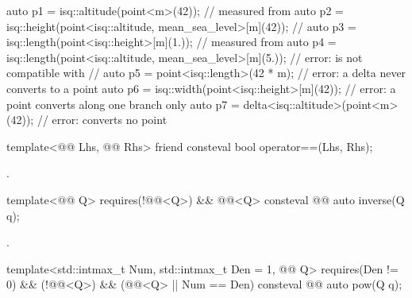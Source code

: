 \begin{itemdescr}
\begin{example}
\begin{codeblock}
auto p1 = isq::altitude(point<m>(42));                      // measured from 
auto p2 = isq::height(point<isq::altitude, mean_sea_level>[m](42));
                                                           // 
auto p3 = isq::length(point<isq::height>[m](1.));           // measured from 
auto p4 = isq::length(point<isq::altitude, mean_sea_level>[m](5.));
                                                           // error:  is not compatible with
                                                           // 
auto p5 = point<isq::length>(42 * m);                       // error: a delta never converts to a point
auto p6 = isq::width(point<isq::height>[m](42));            // error: a point converts along one branch only
auto p7 = delta<isq::altitude>(point<m>(42));               // error:  converts no point
\end{codeblock}
\end{example}
\end{itemdescr}

\begin{itemdecl}
template<@@ Lhs, @@ Rhs>
friend consteval bool operator==(Lhs, Rhs);
\end{itemdecl}

\begin{itemdescr}
\pnum
\returns
{}.
\end{itemdescr}

\begin{itemdecl}
template<@@ Q>
  requires(!@@<Q>) && @@<Q>
consteval @@ auto inverse(Q q);
\end{itemdecl}

\begin{itemdescr}
\pnum
\returns
{}.
\end{itemdescr}

\begin{itemdecl}
template<std::intmax_t Num, std::intmax_t Den = 1, @@ Q>
  requires(Den != 0) && (!@@<Q>) && (@@<Q> || Num == Den)
consteval @@ auto pow(Q q);
\end{itemdecl}

